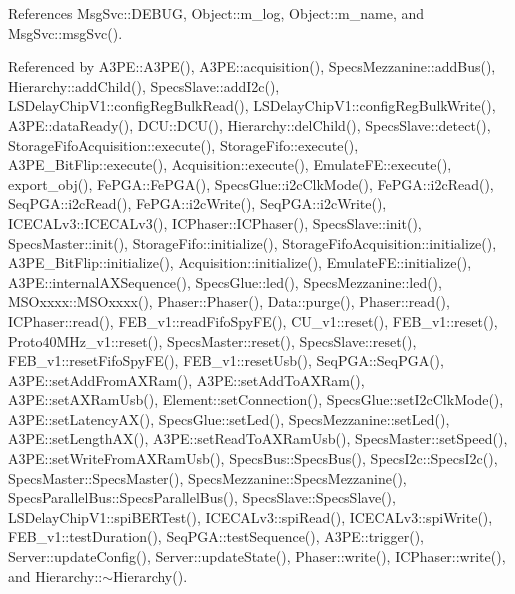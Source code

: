 References Msg\+Svc\+::\+D\+E\+B\+UG, Object\+::m\+\_\+log, Object\+::m\+\_\+name, and Msg\+Svc\+::msg\+Svc().



Referenced by A3\+P\+E\+::\+A3\+P\+E(), A3\+P\+E\+::acquisition(), Specs\+Mezzanine\+::add\+Bus(), Hierarchy\+::add\+Child(), Specs\+Slave\+::add\+I2c(), L\+S\+Delay\+Chip\+V1\+::config\+Reg\+Bulk\+Read(), L\+S\+Delay\+Chip\+V1\+::config\+Reg\+Bulk\+Write(), A3\+P\+E\+::data\+Ready(), D\+C\+U\+::\+D\+C\+U(), Hierarchy\+::del\+Child(), Specs\+Slave\+::detect(), Storage\+Fifo\+Acquisition\+::execute(), Storage\+Fifo\+::execute(), A3\+P\+E\+\_\+\+Bit\+Flip\+::execute(), Acquisition\+::execute(), Emulate\+F\+E\+::execute(), export\+\_\+obj(), Fe\+P\+G\+A\+::\+Fe\+P\+G\+A(), Specs\+Glue\+::i2c\+Clk\+Mode(), Fe\+P\+G\+A\+::i2c\+Read(), Seq\+P\+G\+A\+::i2c\+Read(), Fe\+P\+G\+A\+::i2c\+Write(), Seq\+P\+G\+A\+::i2c\+Write(), I\+C\+E\+C\+A\+Lv3\+::\+I\+C\+E\+C\+A\+Lv3(), I\+C\+Phaser\+::\+I\+C\+Phaser(), Specs\+Slave\+::init(), Specs\+Master\+::init(), Storage\+Fifo\+::initialize(), Storage\+Fifo\+Acquisition\+::initialize(), A3\+P\+E\+\_\+\+Bit\+Flip\+::initialize(), Acquisition\+::initialize(), Emulate\+F\+E\+::initialize(), A3\+P\+E\+::internal\+A\+X\+Sequence(), Specs\+Glue\+::led(), Specs\+Mezzanine\+::led(), M\+S\+Oxxxx\+::\+M\+S\+Oxxxx(), Phaser\+::\+Phaser(), Data\+::purge(), Phaser\+::read(), I\+C\+Phaser\+::read(), F\+E\+B\+\_\+v1\+::read\+Fifo\+Spy\+F\+E(), C\+U\+\_\+v1\+::reset(), F\+E\+B\+\_\+v1\+::reset(), Proto40\+M\+Hz\+\_\+v1\+::reset(), Specs\+Master\+::reset(), Specs\+Slave\+::reset(), F\+E\+B\+\_\+v1\+::reset\+Fifo\+Spy\+F\+E(), F\+E\+B\+\_\+v1\+::reset\+Usb(), Seq\+P\+G\+A\+::\+Seq\+P\+G\+A(), A3\+P\+E\+::set\+Add\+From\+A\+X\+Ram(), A3\+P\+E\+::set\+Add\+To\+A\+X\+Ram(), A3\+P\+E\+::set\+A\+X\+Ram\+Usb(), Element\+::set\+Connection(), Specs\+Glue\+::set\+I2c\+Clk\+Mode(), A3\+P\+E\+::set\+Latency\+A\+X(), Specs\+Glue\+::set\+Led(), Specs\+Mezzanine\+::set\+Led(), A3\+P\+E\+::set\+Length\+A\+X(), A3\+P\+E\+::set\+Read\+To\+A\+X\+Ram\+Usb(), Specs\+Master\+::set\+Speed(), A3\+P\+E\+::set\+Write\+From\+A\+X\+Ram\+Usb(), Specs\+Bus\+::\+Specs\+Bus(), Specs\+I2c\+::\+Specs\+I2c(), Specs\+Master\+::\+Specs\+Master(), Specs\+Mezzanine\+::\+Specs\+Mezzanine(), Specs\+Parallel\+Bus\+::\+Specs\+Parallel\+Bus(), Specs\+Slave\+::\+Specs\+Slave(), L\+S\+Delay\+Chip\+V1\+::spi\+B\+E\+R\+Test(), I\+C\+E\+C\+A\+Lv3\+::spi\+Read(), I\+C\+E\+C\+A\+Lv3\+::spi\+Write(), F\+E\+B\+\_\+v1\+::test\+Duration(), Seq\+P\+G\+A\+::test\+Sequence(), A3\+P\+E\+::trigger(), Server\+::update\+Config(), Server\+::update\+State(), Phaser\+::write(), I\+C\+Phaser\+::write(), and Hierarchy\+::$\sim$\+Hierarchy().


